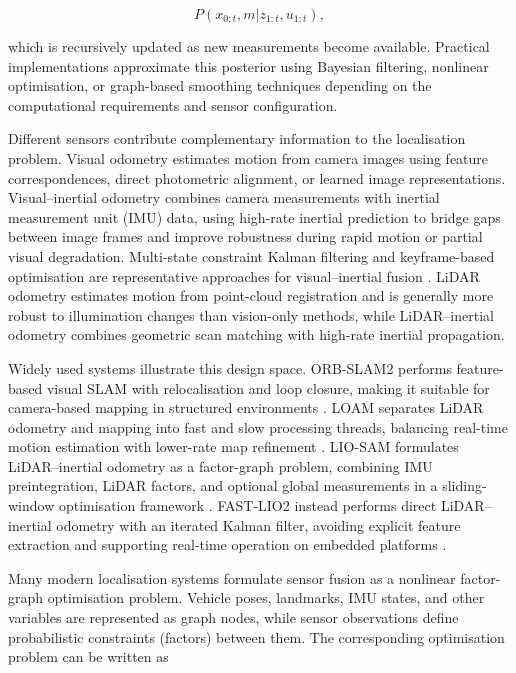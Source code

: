 \documentclass[graybox,envcountchap]{style/SNmono}
\begin{document}
\begin{equation}
P(x_{0:t},m|z_{1:t},u_{1:t}),
\label{eq:slam_posterior}
\end{equation}

which is recursively updated as new measurements become available. Practical implementations approximate this posterior using Bayesian filtering, nonlinear optimisation, or graph-based smoothing techniques depending on the computational requirements and sensor configuration.

Different sensors contribute complementary information to the localisation problem. Visual odometry estimates motion from camera images using feature correspondences, direct photometric alignment, or learned image representations. Visual--inertial odometry combines camera measurements with inertial measurement unit (IMU) data, using high-rate inertial prediction to bridge gaps between image frames and improve robustness during rapid motion or partial visual degradation. Multi-state constraint Kalman filtering and keyframe-based optimisation are representative approaches for visual--inertial fusion \cite{mourikis_multistate_2007, leutenegger_keyframe_2015}. LiDAR odometry estimates motion from point-cloud registration and is generally more robust to illumination changes than vision-only methods, while LiDAR--inertial odometry combines geometric scan matching with high-rate inertial propagation.

Widely used systems illustrate this design space. ORB-SLAM2 performs feature-based visual SLAM with relocalisation and loop closure, making it suitable for camera-based mapping in structured environments \cite{murartal2017_orbslam2}. LOAM separates LiDAR odometry and mapping into fast and slow processing threads, balancing real-time motion estimation with lower-rate map refinement \cite{zhang2014_loam}. LIO-SAM formulates LiDAR--inertial odometry as a factor-graph problem, combining IMU preintegration, LiDAR factors, and optional global measurements in a sliding-window optimisation framework \cite{shan2020_liosam}. FAST-LIO2 instead performs direct LiDAR--inertial odometry with an iterated Kalman filter, avoiding explicit feature extraction and supporting real-time operation on embedded platforms \cite{xu2022_fastlio2}.

Many modern localisation systems formulate sensor fusion as a nonlinear factor-graph optimisation problem. Vehicle poses, landmarks, IMU states, and other variables are represented as graph nodes, while sensor observations define probabilistic constraints (factors) between them. The corresponding optimisation problem can be written as
\end{document}
